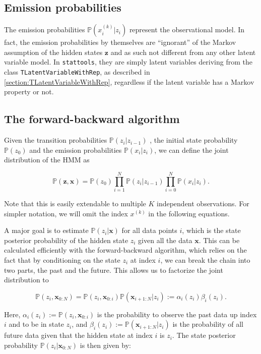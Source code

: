 \documentclass[a4paper,11pt]{article}
\def\x{\boldsymbol{x}}
\def\z{\boldsymbol{z}}
\def\p{\mathbb{P}}
\def\stattools{\texttt{stattools}}
\newcommand{\class}[1]{\texttt{#1}}
\begin{document}
\subsection{Emission probabilities}
The emission probabilities $\p(x_i^{(k)} | z_i)$ represent the observational model. In fact, the emission probabilities by themselves are ``ignorant'' of the Markov assumption of the hidden states $\z$ and as such not different from any other latent variable model. In \stattools{}, they are simply latent variables deriving from the class \class{TLatentVariableWithRep}, as described in  \ref{section:TLatentVariableWithRep}, regardless if the latent variable has a Markov property or not.

\subsection{The forward-backward algorithm}

Given the transition probabilities $\p(z_i | z_{i-1})$ , the initial state probability $\p(z_0)$ and the emission probabilities $\p(x_i | z_i)$, we can define the joint distribution of the HMM as

\begin{equation*}
 \p(\z, \x) = \p(z_0) \prod_{i=1}^N \p(z_i | z_{i-1}) \prod_{i=0}^N \p(x_i | z_i) .
\end{equation*}

Note that this is easily extendable to multiple $K$ independent observations. For simpler notation, we will omit the index $x^{(k)}$ in the following equations.

A major goal is to estimate $\p(z_i | \x)$ for all data points $i$, which is the state posterior probability of the hidden state $z_i$ given all the data $\x$. This can be calculated efficiently with the forward-backward algorithm, which relies on the fact that by conditioning on the state $z_i$ at index $i$, we can break the chain into two parts, the past and the future. This allows us to factorize the joint distribution to

\begin{equation*}
\p(z_i, \x_{0:N}) = \p(z_i, \x_{0:i}) \p(\x_{i+1:N} | z_i):= \alpha_i(z_i)\beta_i(z_i).
\end{equation*}

Here, $\alpha_i(z_i):=\p(z_i, \x_{0:i})$ is the probability to observe the past data up index $i$ and to be in state $z_i$, and $\beta_i(z_i):= \p(\x_{i+1:N} | z_i)$ is the probability of all future data given that the hidden state at index $i$ is $z_i$.
The state posterior probability $\p(z_i | \x_{0:N})$ is then given by:
\end{document}
